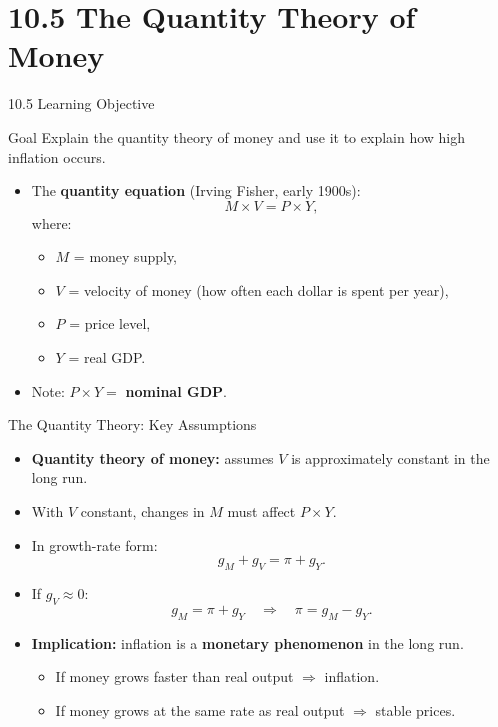 \documentclass[aspectratio=169]{beamer}
\begin{document}
\section{10.5 The Quantity Theory of Money}

\begin{frame}{10.5 Learning Objective}
\transfade
\begin{block}{Goal}
Explain the quantity theory of money and use it to explain how high inflation occurs.
\end{block}
\begin{itemize}
  \item The \textbf{quantity equation} (Irving Fisher, early 1900s):
  \[
    M \times V = P \times Y,
  \]
  where:
  \begin{itemize}
    \item $M$ = money supply,
    \item $V$ = velocity of money (how often each dollar is spent per year),
    \item $P$ = price level,
    \item $Y$ = real GDP.
  \end{itemize}
  \item Note: $P \times Y = $ \textbf{nominal GDP}.
\end{itemize}
\end{frame}

\begin{frame}{The Quantity Theory: Key Assumptions}
\transfade
\begin{itemize}
  \item \textbf{Quantity theory of money:} assumes $V$ is approximately constant in the long run.
  \item With $V$ constant, changes in $M$ must affect $P \times Y$.
  \item In growth-rate form:
  \[
    g_M + g_V = \pi + g_Y.
  \]
  \item If $g_V \approx 0$:
  \[
    g_M = \pi + g_Y \quad \Rightarrow \quad \boxed{\pi = g_M - g_Y}.
  \]
  \item \textbf{Implication:} inflation is a \textbf{monetary phenomenon} in the long run.
  \begin{itemize}
    \item If money grows faster than real output $\Rightarrow$ inflation.
    \item If money grows at the same rate as real output $\Rightarrow$ stable prices.
  \end{itemize}
\end{itemize}
\end{frame}
\end{document}
